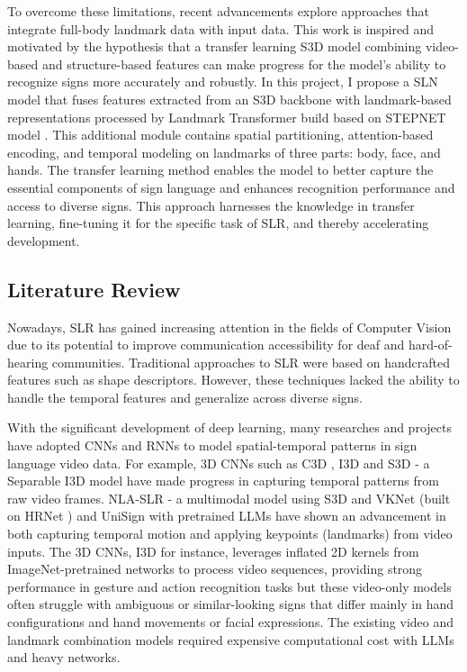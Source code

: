 \documentclass{article}
\begin{document}
\vspace{0.5cm}

To overcome these limitations, recent advancements explore approaches that integrate full-body landmark data with input data. This work is inspired and motivated by the hypothesis that a transfer learning S3D \cite{xie2017rethinking} model combining video-based and structure-based features can make progress for the model's ability to recognize signs more accurately and robustly. In this project, I propose a SLN model that fuses features extracted from an S3D \cite{xie2017rethinking} backbone with landmark-based representations processed by Landmark Transformer build based on STEPNET model \cite{pan2022stepnet}. This additional module contains spatial partitioning, attention-based encoding, and temporal modeling on landmarks of three parts: body, face, and hands. The transfer learning method enables the model to better capture the essential components of sign language and enhances recognition performance and access to diverse signs. This approach harnesses the knowledge in transfer learning, fine-tuning it for the specific task of SLR, and thereby accelerating development.

\subsection{Literature Review}
Nowadays, SLR has gained increasing attention in the fields of Computer Vision due to its potential to improve communication accessibility for deaf and hard-of-hearing communities. Traditional approaches to SLR were based on handcrafted features such as shape descriptors. However, these techniques lacked the ability to handle the temporal features and generalize across diverse signs.

\vspace{0.5cm}

With the significant development of deep learning, many researches and projects have adopted CNNs and RNNs to model spatial-temporal patterns in sign language video data. For example, 3D CNNs such as C3D \cite{tran2015learning}, I3D \cite{carreira2017quo} and S3D \cite{xie2017rethinking} - a Separable I3D model have made progress in capturing temporal patterns from raw video frames. NLA-SLR \cite{zuo2023natural} - a multimodal model using S3D and VKNet (built on HRNet \cite{sun2019deep}) and UniSign \cite{li2025uni-sign} with pretrained LLMs have shown an advancement in both capturing temporal motion and applying keypoints (landmarks) from video inputs. The 3D CNNs, I3D for instance, leverages inflated 2D kernels from ImageNet-pretrained networks to process video sequences, providing strong performance in gesture and action recognition tasks but these video-only models often struggle with ambiguous or similar-looking signs that differ mainly in hand configurations and hand movements or facial expressions. The existing video and landmark combination models required expensive computational cost with LLMs and heavy networks.
\end{document}
